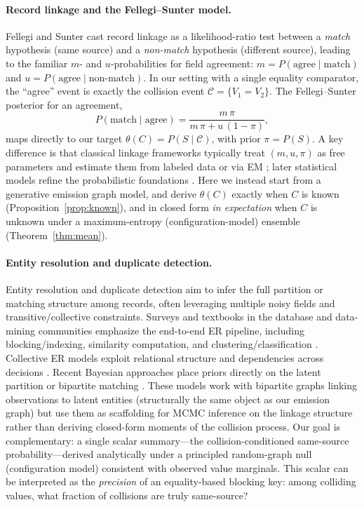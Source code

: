 \documentclass[11pt]{article}
\newcommand{\1}{\mathbf{1}}
\newcommand{\coll}{\mathcal{C}} %
\theoremstyle{plain}
\theoremstyle{definition}
\begin{document}
\paragraph{Record linkage and the Fellegi--Sunter model.}
Fellegi and Sunter \cite{fellegi1969} cast record linkage as a likelihood-ratio test between a
\emph{match} hypothesis (same source) and a \emph{non-match} hypothesis (different source),
leading to the familiar $m$- and $u$-probabilities for field agreement:
$m = P(\text{agree}\mid \text{match})$ and $u = P(\text{agree}\mid \text{non-match})$.
In our setting with a single equality comparator, the ``agree'' event is exactly the collision event $\coll=\{V_1=V_2\}$.
The Fellegi--Sunter posterior for an agreement,
\[
P(\text{match}\mid \text{agree})=\frac{m\,\pi}{m\,\pi + u\,(1-\pi)},
\]
maps directly to our target $\theta(C)=P(S\mid \coll)$, with prior $\pi=P(S)$.
A key difference is that classical linkage frameworks typically treat $(m,u,\pi)$ as free parameters and
estimate them from labeled data or via EM \cite{jaro1989,winkler2006};
later statistical models refine the probabilistic foundations \cite{copas1990}.
Here we instead start from a generative emission graph model, and derive $\theta(C)$ exactly when $C$ is known
(Proposition~\ref{prop:known}), and in closed form \emph{in expectation} when $C$ is unknown under a
maximum-entropy (configuration-model) ensemble (Theorem~\ref{thm:mean}).

\paragraph{Entity resolution and duplicate detection.}
Entity resolution and duplicate detection aim to infer the full partition or matching structure among records,
often leveraging multiple noisy fields and transitive/collective constraints.
Surveys and textbooks in the database and data-mining communities emphasize the end-to-end ER pipeline,
including blocking/indexing, similarity computation, and clustering/classification
\cite{elmagarmid2007,hernandez1995,christen2012book,christen2012survey,getoor2012}.
Collective ER models exploit relational structure and dependencies across decisions
\cite{bhattacharya2007}.
Recent Bayesian approaches place priors directly on the latent partition or bipartite matching
\cite{steorts2016,sadinle2017}.
These models work with bipartite graphs linking observations to latent entities (structurally the same object as our emission graph) but use them as scaffolding for MCMC inference on the linkage structure rather than deriving closed-form moments of the collision process.
Our goal is complementary: a single scalar summary---the collision-conditioned same-source probability---derived analytically under a principled random-graph null (configuration model) consistent with observed value marginals.
This scalar can be interpreted as the \emph{precision} of an equality-based blocking key:
among colliding values, what fraction of collisions are truly same-source?
\end{document}
